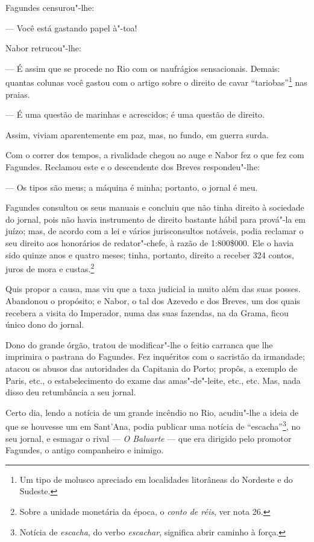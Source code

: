 Fagundes censurou"-lhe:

--- Você está gastando papel à"-toa!

Nabor retrucou"-lhe:

--- É assim que se procede no Rio com os naufrágios sensacionais.
Demais: quantas colunas você gastou com o artigo sobre o direito de
cavar ``tariobas''\footnote{Um tipo de molusco apreciado em localidades
  litorâneas do Nordeste e do Sudeste.} nas praias.

--- É uma questão de marinhas e acrescidos; é uma questão de direito.

Assim, viviam aparentemente em paz, mas, no fundo, em guerra surda.

Com o correr dos tempos, a rivalidade chegou ao auge e Nabor fez o que
fez com Fagundes. Reclamou este e o descendente dos Breves
respondeu"-lhe:

--- Os tipos são meus; a máquina é minha; portanto, o jornal é meu.

Fagundes consultou os seus manuais e concluiu que não tinha direito à
sociedade do jornal, pois não havia instrumento de direito bastante
hábil para prová"-la em juízo; mas, de acordo com a lei e vários
jurisconsultos notáveis, podia reclamar o seu direito aos honorários de
redator"-chefe, à razão de 1:800\$000. Ele o havia sido quinze anos e
quatro meses; tinha, portanto, direito a receber 324 contos, juros de
mora e custas.\footnote{Sobre a unidade monetária da época, o
  \emph{conto de réis}, ver nota 26.}

Quis propor a causa, mas viu que a taxa judicial ia muito além das suas
posses. Abandonou o propósito; e Nabor, o tal dos Azevedo e dos Breves,
um dos quais recebera a visita do Imperador, numa das suas fazendas, na
da Grama, ficou único dono do jornal.

Dono do grande órgão, tratou de modificar"-lhe o feitio carranca que lhe
imprimira o pastrana do Fagundes. Fez inquéritos com o sacristão da
irmandade; atacou os abusos das autoridades da Capitania do Porto;
propôs, a exemplo de Paris, etc., o estabelecimento do exame das
amas"-de"-leite, etc., etc. Mas, nada disso deu retumbância a seu jornal.

Certo dia, lendo a notícia de um grande incêndio no Rio, acudiu"-lhe a
ideia de que se houvesse um em Sant'Ana, podia publicar uma notícia de
``escacha''\footnote{Notícia de \emph{escacha}, do verbo
  \emph{escachar}, significa abrir caminho à força.}, no seu jornal, e
esmagar o rival --- \emph{O Baluarte} --- que era dirigido pelo promotor
Fagundes, o antigo companheiro e inimigo.

